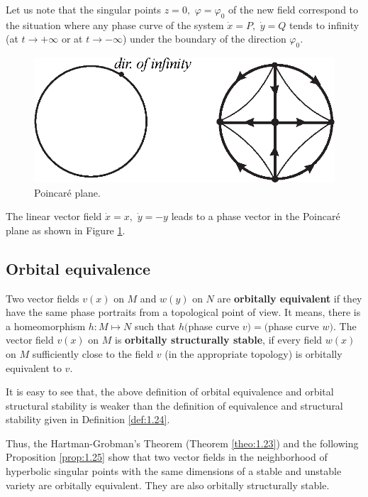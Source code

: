 Let us note that the singular points $z=0,$ $\varphi =\varphi _{0}$ of the new field correspond to the situation where any phase curve of the system $\dot{x}=P,$ $\dot{y}=Q$ tends to infinity (at $t\rightarrow +\infty $ or at $t\rightarrow -\infty$) under the boundary of the direction $ \varphi _ {0}$.

\begin{figure}[!ht]
		\centering
		\includegraphics [scale=1]{jtr220}
		\caption{Poincaré plane.}
		\label{fig:2.20}
\end{figure}

\begin{example}
	The linear vector field $\dot{x}=x,$ $\dot{y}=-y$ leads to a phase vector in the Poincaré plane as shown in Figure \ref{fig:2.20}.
\end{example}

\subsection{Orbital equivalence}

\begin{definition}
	Two vector fields $v (x)$ on $M$ and $w (y)$ on $N$ are \textbf{orbitally equivalent} if they have the same phase portraits from a topological point of view. It means, there is a homeomorphism $h:M\longmapsto N$ such that $h ($phase curve $v) = ($phase curve $w)$.
	The vector field $v (x)$ on $M$ is \textbf{orbitally structurally stable}, if every field $w(x)$ on $M$ sufficiently close to the field $v$ (in the appropriate topology) is orbitally equivalent to $v$.
\end{definition}

It is easy to see that, the above definition of orbital equivalence and orbital structural stability is weaker than the definition of equivalence and structural stability given in Definition \ref{def:1.24}.

Thus, the Hartman-Grobman's Theorem (Theorem \ref{theo:1.23}) and the following Proposition \ref{prop:1.25} show that two vector fields in the neighborhood of hyperbolic singular points with the same dimensions of a stable and unstable variety are orbitally equivalent. They are also orbitally structurally stable.

